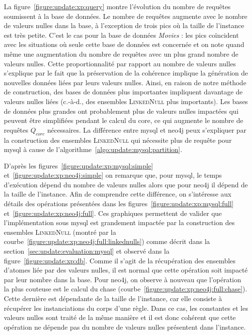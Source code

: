 La figure~\ref{figure:update:xp:query} montre l'évolution du nombre de requêtes soumissent à la base de données.
Le nombre de requêtes augmente avec le nombre de valeurs nulles dans la base, à l'exception de trois pics où la taille de l'instance est très petite.
C'est le cas pour la base de données \textit{Movies} : les pics coïncident avec les situations où seule cette base de données est concernée et on note quand même une augmentation du nombre de requêtes avec un plus grand nombre de valeurs nulles.
Cette proportionnalité par rapport au nombre de valeurs nulles s'explique par le fait que la préservation de la cohérence implique la génération de nouvelles données liées par leurs valeurs nulles.
Ainsi, en raison de notre méthode de construction, des bases de données plus importantes impliquent davantage de valeurs nulles liées (c.-à-d., des ensembles \textsc{LinkedNull} plus importants).
Les bases de données plus grandes ont probablement plus de valeurs nulles impactées qui peuvent être simplifiées pendant le calcul du core, ce qui augmente le nombre de requêtes $Q_{core}$ nécessaires.
La différence entre \gls{mysql} et \gls{neo4j} peux s'expliquer par la construction des ensembles \textsc{LinkedNull} qui nécessite plus de requête pour \gls{mysql} à cause de l'algorithme~\ref{algo:update:mysql:partition}.

D'après les figures~\ref{figure:update:xp:mysql:simple} et~\ref{figure:update:xp:neo4j:simple} on remarque que, pour \gls{mysql}, le temps d'exécution dépend du nombre de valeurs nulles alors que pour \gls{neo4j} il dépend de la taille de l'instance.
Afin de comprendre cette différence, on s'intéresse aux détails des opérations présentées dans les figures~\ref{figure:update:xp:mysql:full} et~\ref{figure:update:xp:neo4j:full}.
Ces graphiques permettent de valider que l'implémentation sous \gls{mysql} est grandement impactée par la construction des ensembles \textsc{LinkedNull} (montré par la courbe~\ref{figure:update:xp:neo4j:full:linkednulls}) comme décrit dans la section~\ref{sec:update:evaluation:mysql} et observé dans la figure~\ref{figure:update:xp:db}.
Comme il s'agit de la récupération des ensembles d'atomes liée par des valeurs nulles, il est normal que cette opération soit impacté par leur nombre dans la base.
Pour \gls{neo4j}, on observe à nouveau que l'opération la plus couteuse est le calcul du \gls{chase} (courbe~\ref{figure:update:xp:neo4j:full:chase}).
Cette dernière est dépendante de la taille de l'instance, car elle consiste à récupérer les instanciations du corps d'une règle.
Dans ce cas, les constantes et les valeurs nulles sont traité de la même manière et il est donc cohérent que cette opération ne dépende pas du nombre de valeurs nulles présentent dans l'instance.

